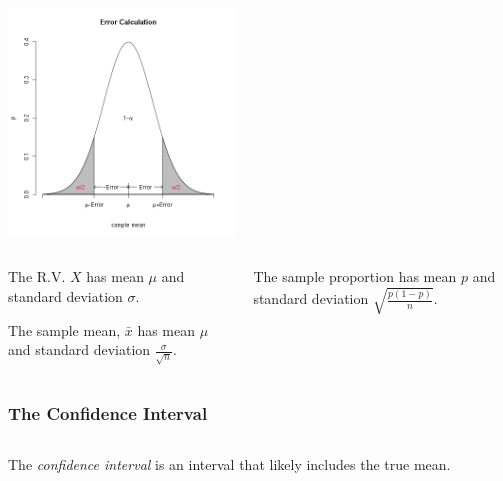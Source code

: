 \begin{frame}

  \centerline{\includegraphics[width=6cm]{img/confidenceInterval}}

  \begin{columns}[T]

    \begin{column}[T]{0.5\textwidth}
      The R.V. $X$ has mean $\mu$ and standard deviation $\sigma$.

      The sample mean, $\bar{x}$ has mean $\mu$ and standard deviation
      $\frac{\sigma}{\sqrt{n}}$.

    \end{column}

    \begin{column}[T]{0.5\textwidth}
      The sample proportion has mean $p$ and standard deviation
      $\sqrt{\frac{p(1-p)}{n}}$.

    \end{column}

  \end{columns}


\end{frame}



\begin{frame}
  \frametitle{The Confidence Interval}

  \begin{columns}
    \begin{definition}
      The \textit{confidence interval} is an interval that likely
      includes the true mean.
    \end{definition}


    

  \end{columns}

\end{frame}

